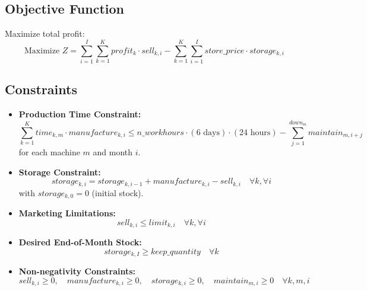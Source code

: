 \documentclass{article}
\begin{document}
\subsection*{Objective Function}
Maximize total profit:
\[
\text{Maximize } Z = \sum_{i=1}^{I} \sum_{k=1}^{K} profit_k \cdot sell_{k,i} - \sum_{k=1}^{K} \sum_{i=1}^{I} store\_price \cdot storage_{k,i}
\]

\subsection*{Constraints}

\begin{itemize}
    \item \textbf{Production Time Constraint:}
    \[
    \sum_{k=1}^{K} time_{k,m} \cdot manufacture_{k,i} \leq n\_workhours \cdot (6 \text{ days}) \cdot (24 \text{ hours}) - \sum_{j=1}^{down_m} maintain_{m,i+j}
    \]
    for each machine $m$ and month $i$.

    \item \textbf{Storage Constraint:}
    \[
    storage_{k,i} = storage_{k,i-1} + manufacture_{k,i} - sell_{k,i} \quad \forall k, \forall i
    \]
    with $storage_{k,0} = 0$ (initial stock).

    \item \textbf{Marketing Limitations:}
    \[
    sell_{k,i} \leq limit_{k,i} \quad \forall k, \forall i
    \]

    \item \textbf{Desired End-of-Month Stock:}
    \[
    storage_{k,I} \geq keep\_quantity \quad \forall k
    \]

    \item \textbf{Non-negativity Constraints:}
    \[
    sell_{k,i} \geq 0, \quad manufacture_{k,i} \geq 0, \quad storage_{k,i} \geq 0, \quad maintain_{m,i} \geq 0 \quad \forall k, m, i
    \]
\end{itemize}
\end{document}
